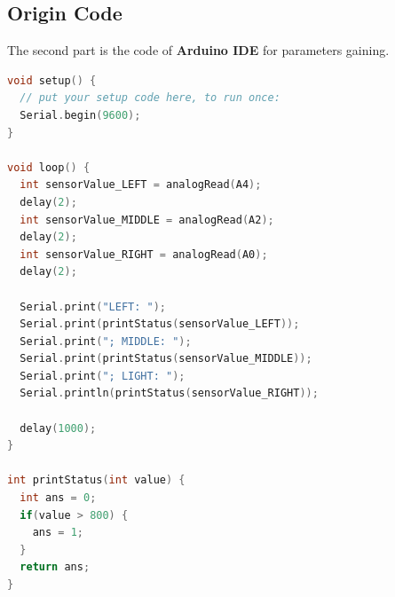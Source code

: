 \subsection*{Origin Code}
The second part is the code of \textbf{Arduino IDE} for parameters gaining.
\begin{lstlisting}[language=C++,label={lst:lstlisting}]
void setup() {
  // put your setup code here, to run once:
  Serial.begin(9600);
}

void loop() {
  int sensorValue_LEFT = analogRead(A4);
  delay(2);
  int sensorValue_MIDDLE = analogRead(A2);
  delay(2);
  int sensorValue_RIGHT = analogRead(A0);
  delay(2);

  Serial.print("LEFT: ");
  Serial.print(printStatus(sensorValue_LEFT));
  Serial.print("; MIDDLE: ");
  Serial.print(printStatus(sensorValue_MIDDLE));
  Serial.print("; LIGHT: ");
  Serial.println(printStatus(sensorValue_RIGHT));

  delay(1000);
}

int printStatus(int value) {
  int ans = 0;
  if(value > 800) {
    ans = 1;
  }
  return ans;
}
\end{lstlisting}